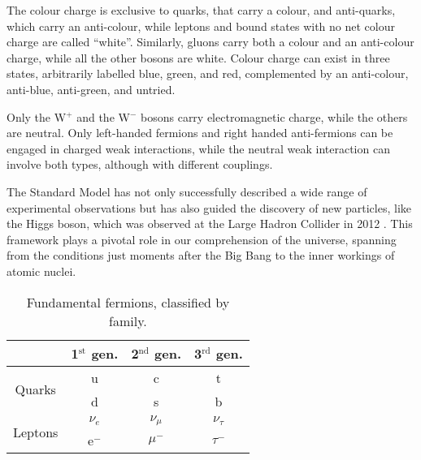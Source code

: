 The colour charge is exclusive to quarks, that carry a colour, and anti-quarks, which carry an anti-colour, while leptons and bound states with no net colour charge are called ``white''.
Similarly, gluons carry both a colour and an anti-colour charge, while all the other bosons are white.
Colour charge can exist in three states, arbitrarily labelled blue, green, and red, complemented by an anti-colour, anti-blue, anti-green, and untried.

Only the W$^+$ and the W$^-$ bosons carry electromagnetic charge, while the others are neutral.
Only left-handed fermions and right handed anti-fermions can be engaged in charged weak interactions, while the neutral weak interaction can involve both types, although with different couplings.

The Standard Model has not only successfully described a wide range of experimental observations but has also guided the discovery of new particles, like the Higgs boson, which was observed at the Large Hadron Collider in 2012 \cite{ATLASHiggsDiscovery, CMSHiggsDiscovery}.
This framework plays a pivotal role in our comprehension of the universe, spanning from the conditions just moments after the Big Bang to the inner workings of atomic nuclei.

\begin{table}[tbh]
	\centering
	\caption{Fundamental fermions, classified by family.}
	\label{tab:fermions}
	\begin{tabular}{ c c c c }
		\toprule
		 & 1$^{\text{st}}$ gen. & 2$^{\text{nd}}$ gen. & 3$^{\text{rd}}$ gen. \\%
		\midrule
		\multirow{2}{*}{Quarks}  & u       & c         & t          \\%
		                         & d       & s         & b          \\%
		\hline
		\multirow{2}{*}{Leptons} & $\nu_e$ & $\nu_\mu$ & $\nu_\tau$ \\%
		                         & e$^-$   & $\mu$$^-$ & $\tau$$^-$ \\%
		\bottomrule
	\end{tabular}
\end{table}

